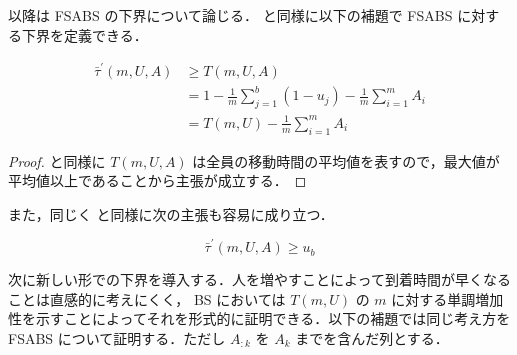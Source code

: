 以降は FSABS の下界について論じる．  と同様に以下の補題で FSABS に対する下界を定義できる．
\begin{lemma}\label{lemma:fsabs-lower-bound-absolute}
  \begin{align}
    \bar\tau^{\prime}(m, U, A) &\geq T(m, U, A) \\
                      &= 1 - \frac{1}{m}\sum_{j = 1}^b (1 - u_j) - \frac{1}{m}\sum_{i = 1}^{m} A_i \\
                      &= T(m, U) - \frac{1}{m}\sum_{i = 1}^{m} A_i
  \end{align}
\end{lemma}
\begin{proof}
   と同様に $T(m, U, A)$ は全員の移動時間の平均値を表すので，最大値が平均値以上であることから主張が成立する．
\end{proof}
また，同じく  と同様に次の主張も容易に成り立つ．
\begin{lemma}\label{lemma:fsabs-lower-bound-bike}
  \begin{equation}
    \bar\tau^\prime(m, U, A) \geq u_b
  \end{equation}
\end{lemma}

次に新しい形での下界を導入する．人を増やすことによって到着時間が早くなることは直感的に考えにくく， BS においては $T(m, U)$ の $m$ に対する単調増加性を示すことによってそれを形式的に証明できる．以下の補題では同じ考え方を FSABS について証明する．ただし $A_{:k}$ を $A_k$ までを含んだ列とする．

